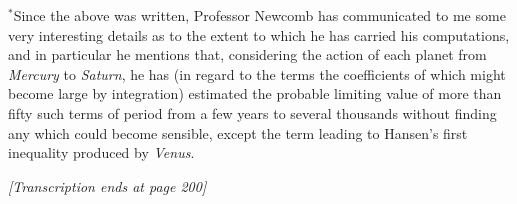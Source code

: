 \documentclass[12pt,a4paper]{article}
\begin{document}
\bigskip
\noindent$^*$Since the above was written, Professor Newcomb has communicated to me some very interesting details as to the extent to which he has carried his computations, and in particular he mentions that, considering the action of each planet from \textit{Mercury} to \textit{Saturn}, he has (in regard to the terms the coefficients of which might become large by integration) estimated the probable limiting value of more than fifty such terms of period from a few years to several thousands without finding any which could become sensible, except the term leading to Hansen's first inequality produced by \textit{Venus}.

\vfill
\begin{center}
\textit{[Transcription ends at page 200]}
\end{center}
\end{document}
